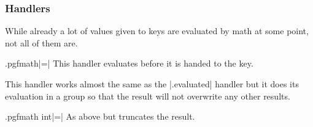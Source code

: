 \begin{multicols}{2}
\subsubsection{Handlers}

While already a lot of values given to keys are evaluated by \pgfname math at some point,
not all of them are.

\begin{handler}{{.pgfmath}|=|}
  This handler evaluates  before it is handed to the key.
  
  This handler works almost the same as the |.evaluated|
  handler but it does its evaluation in a group so that the result will 
  not overwrite any other results.
\end{handler}

\begin{handler}{{.pgfmath int}|=|}
  As above but truncates the result.
\end{handler}



\end{multicols}
